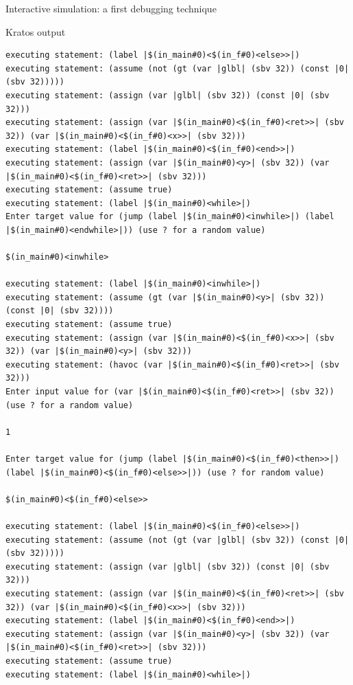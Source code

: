 \documentclass[aspectratio=1610,10.5pt]{beamer} %
\begin{document}
\begin{frame}[fragile]{Interactive simulation: a first debugging technique}
    \begin{block}{Kratos output}
            \begin{verbatim}
executing statement: (label |$(in_main#0)<$(in_f#0)<else>>|)
executing statement: (assume (not (gt (var |glbl| (sbv 32)) (const |0| (sbv 32)))))
executing statement: (assign (var |glbl| (sbv 32)) (const |0| (sbv 32)))
executing statement: (assign (var |$(in_main#0)<$(in_f#0)<ret>>| (sbv 32)) (var |$(in_main#0)<$(in_f#0)<x>>| (sbv 32)))
executing statement: (label |$(in_main#0)<$(in_f#0)<end>>|)
executing statement: (assign (var |$(in_main#0)<y>| (sbv 32)) (var |$(in_main#0)<$(in_f#0)<ret>>| (sbv 32)))
executing statement: (assume true)
executing statement: (label |$(in_main#0)<while>|)
Enter target value for (jump (label |$(in_main#0)<inwhile>|) (label |$(in_main#0)<endwhile>|)) (use ? for a random value)

$(in_main#0)<inwhile>

executing statement: (label |$(in_main#0)<inwhile>|)
executing statement: (assume (gt (var |$(in_main#0)<y>| (sbv 32)) (const |0| (sbv 32))))
executing statement: (assume true)
executing statement: (assign (var |$(in_main#0)<$(in_f#0)<x>>| (sbv 32)) (var |$(in_main#0)<y>| (sbv 32)))
executing statement: (havoc (var |$(in_main#0)<$(in_f#0)<ret>>| (sbv 32)))
Enter input value for (var |$(in_main#0)<$(in_f#0)<ret>>| (sbv 32)) (use ? for a random value)

1

Enter target value for (jump (label |$(in_main#0)<$(in_f#0)<then>>|) (label |$(in_main#0)<$(in_f#0)<else>>|)) (use ? for random value)

$(in_main#0)<$(in_f#0)<else>>

executing statement: (label |$(in_main#0)<$(in_f#0)<else>>|)
executing statement: (assume (not (gt (var |glbl| (sbv 32)) (const |0| (sbv 32)))))
executing statement: (assign (var |glbl| (sbv 32)) (const |0| (sbv 32)))
executing statement: (assign (var |$(in_main#0)<$(in_f#0)<ret>>| (sbv 32)) (var |$(in_main#0)<$(in_f#0)<x>>| (sbv 32)))
executing statement: (label |$(in_main#0)<$(in_f#0)<end>>|)
executing statement: (assign (var |$(in_main#0)<y>| (sbv 32)) (var |$(in_main#0)<$(in_f#0)<ret>>| (sbv 32)))
executing statement: (assume true)
executing statement: (label |$(in_main#0)<while>|)
            \end{verbatim}
    \end{block}
\end{frame}
\end{document}
